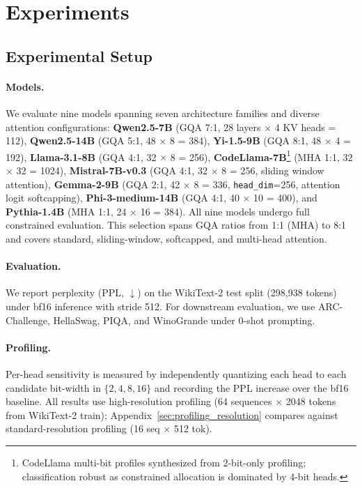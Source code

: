 \section{Experiments}
\label{sec:experiments}

\subsection{Experimental Setup}
\label{sec:setup}

\paragraph{Models.}
We evaluate nine models spanning seven architecture families and diverse attention configurations:
\textbf{Qwen2.5-7B} (GQA 7:1, 28 layers $\times$ 4 KV heads = 112),
\textbf{Qwen2.5-14B} (GQA 5:1, 48 $\times$ 8 = 384),
\textbf{Yi-1.5-9B} (GQA 8:1, 48 $\times$ 4 = 192),
\textbf{Llama-3.1-8B} (GQA 4:1, 32 $\times$ 8 = 256),
\textbf{CodeLlama-7B}\footnote{CodeLlama multi-bit profiles synthesized from 2-bit-only profiling; classification robust as constrained allocation is dominated by 4-bit heads.} (MHA 1:1, 32 $\times$ 32 = 1024),
\textbf{Mistral-7B-v0.3} (GQA 4:1, 32 $\times$ 8 = 256, sliding window attention),
\textbf{Gemma-2-9B} (GQA 2:1, 42 $\times$ 8 = 336, \texttt{head\_dim}=256, attention logit softcapping),
\textbf{Phi-3-medium-14B} (GQA 4:1, 40 $\times$ 10 = 400),
and \textbf{Pythia-1.4B} (MHA 1:1, 24 $\times$ 16 = 384).
All nine models undergo full constrained evaluation.
This selection spans GQA ratios from 1:1 (MHA) to 8:1 and covers standard, sliding-window, softcapped, and multi-head attention.

\paragraph{Evaluation.}
We report perplexity (PPL, $\downarrow$) on the WikiText-2 test split (298{,}938 tokens) under bf16 inference with stride 512.
For downstream evaluation, we use ARC-Challenge, HellaSwag, PIQA, and WinoGrande under 0-shot prompting.

\paragraph{Profiling.}
Per-head sensitivity is measured by independently quantizing each head to each candidate bit-width in $\{2, 4, 8, 16\}$ and recording the PPL increase over the bf16 baseline.
All results use high-resolution profiling (64 sequences $\times$ 2048 tokens from WikiText-2 train); Appendix~\ref{sec:profiling_resolution} compares against standard-resolution profiling (16 seq $\times$ 512 tok).


